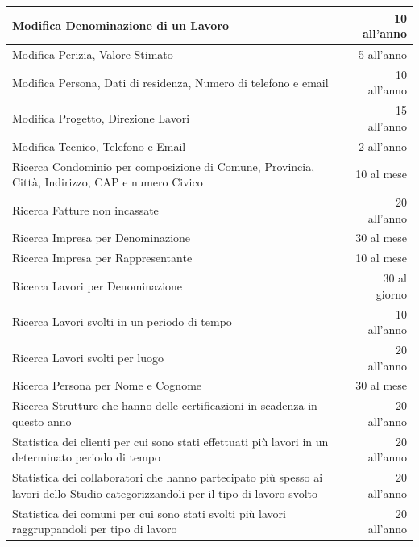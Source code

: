 \documentclass{elegantbook}
\begin{document}
\begin{longtable}{|p{13cm}|r|}
            \hline
            Modifica Denominazione di un Lavoro  &  10 all'anno \\
            \hline
            Modifica Perizia, Valore Stimato  &  5 all'anno \\
            \hline
            Modifica Persona, Dati di residenza, Numero di telefono e email  &  10 all'anno \\
            \hline
            Modifica Progetto, Direzione Lavori  &  15 all'anno \\
            \hline
            Modifica Tecnico, Telefono e Email  &  2 all'anno \\
            \hline
            Ricerca Condominio per composizione di Comune, Provincia, Città, Indirizzo, CAP e numero Civico  &  10 al mese \\
            \hline
            Ricerca Fatture non incassate  & 20 all'anno \\
            \hline
            Ricerca Impresa per Denominazione  & 30 al mese \\
            \hline
            Ricerca Impresa per Rappresentante  & 10 al mese \\
            \hline
            Ricerca Lavori per Denominazione  & 30 al giorno \\
            \hline
            Ricerca Lavori svolti in un periodo di tempo  & 10 all'anno \\
            \hline
            Ricerca Lavori svolti per luogo  & 20 all'anno \\
            \hline 
            Ricerca Persona per Nome e Cognome  & 30 al mese \\
            \hline
            Ricerca Strutture che hanno delle certificazioni in scadenza in questo anno  & 20 all'anno \\
            \hline
            Statistica dei clienti per cui sono stati effettuati più lavori in un determinato periodo di tempo  & 20 all'anno \\
            \hline
            Statistica dei collaboratori che hanno partecipato più spesso ai lavori dello Studio categorizzandoli per il tipo di lavoro svolto  & 20 all'anno \\
            \hline
            Statistica dei comuni per cui sono stati svolti più lavori raggruppandoli per tipo di lavoro  & 20 all'anno \\
            \hline
        \end{longtable}


        \newpage
\end{document}
